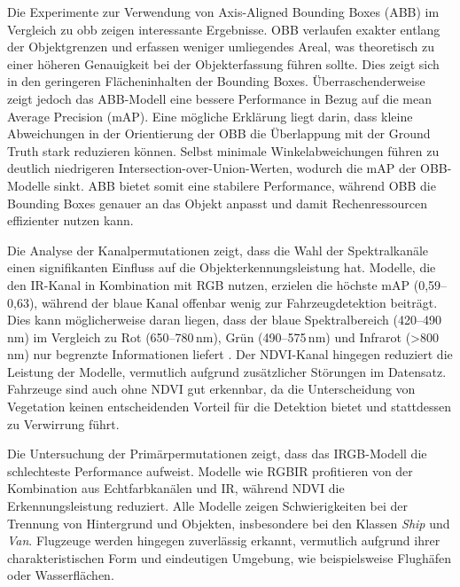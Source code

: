 Die Experimente zur Verwendung von Axis-Aligned Bounding Boxes (ABB) im Vergleich zu \acrfull{obb} zeigen interessante Ergebnisse. OBB verlaufen exakter entlang der Objektgrenzen und erfassen weniger umliegendes Areal, was theoretisch zu einer höheren Genauigkeit bei der Objekterfassung führen sollte. Dies zeigt sich in den geringeren Flächeninhalten der Bounding Boxes. Überraschenderweise zeigt jedoch das ABB-Modell eine bessere Performance in Bezug auf die mean Average Precision (mAP). Eine mögliche Erklärung liegt darin, dass kleine Abweichungen in der Orientierung der OBB die Überlappung mit der Ground Truth stark reduzieren können. Selbst minimale Winkelabweichungen führen zu deutlich niedrigeren Intersection-over-Union-Werten, wodurch die mAP der OBB-Modelle sinkt. ABB bietet somit eine stabilere Performance, während OBB die Bounding Boxes genauer an das Objekt anpasst und damit Rechenressourcen effizienter nutzen kann. 

Die Analyse der Kanalpermutationen zeigt, dass die Wahl der Spektralkanäle einen signifikanten Einfluss auf die Objekterkennungsleistung hat. Modelle, die den IR-Kanal in Kombination mit RGB nutzen, erzielen die höchste mAP (0,59--0,63), während der blaue Kanal offenbar wenig zur Fahrzeugdetektion beiträgt. Dies kann möglicherweise daran liegen, dass der blaue Spektralbereich (420–490\,nm) im Vergleich zu Rot (650–780\,nm), Grün (490–575\,nm) und Infrarot (>800\,nm) nur begrenzte Informationen liefert \cite{bfs_Strahlung}. Der NDVI-Kanal hingegen reduziert die Leistung der Modelle, vermutlich aufgrund zusätzlicher Störungen im Datensatz. Fahrzeuge sind auch ohne NDVI gut erkennbar, da die Unterscheidung von Vegetation keinen entscheidenden Vorteil für die Detektion bietet und stattdessen zu Verwirrung führt. %

Die Untersuchung der Primärpermutationen zeigt, dass das IRGB-Modell die schlechteste Performance aufweist. Modelle wie RGBIR profitieren von der Kombination aus Echtfarbkanälen und IR, während NDVI die Erkennungsleistung reduziert. Alle Modelle zeigen Schwierigkeiten bei der Trennung von Hintergrund und Objekten, insbesondere bei den Klassen \textit{Ship} und \textit{Van}. Flugzeuge werden hingegen zuverlässig erkannt, vermutlich aufgrund ihrer charakteristischen Form und eindeutigen Umgebung, wie beispielsweise Flughäfen oder Wasserflächen. %

